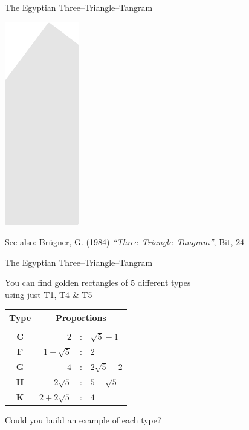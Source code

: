 \documentclass[14pt]{beamer}
\begin{document}
\begin{frame}{The Egyptian Three--Triangle--Tangram}
\begin{center}
            \includegraphics[scale=0.39]{figures/figure004k.pdf}\\

            \bigskip\medskip

            {\footnotesize See also: Brügner, G. (1984) \emph{``Three--Triangle--Tangram''}, Bit, 24}
        \end{center}
    \end{frame}


    \begin{frame}{The Egyptian Three--Triangle--Tangram}
        \begin{center}
            You can find golden rectangles of 5 different types\\[0.5ex]using just T1, T4 \& T5

            \bigskip\bigskip

            {\small\begin{tabular}{c|rcl}
                \textbf{Type} & \multicolumn{3}{c}{\textbf{Proportions}} \\[0.5ex]\hline&&&\\[-1.5ex]
                \textbf{C} & $2$               &\!\!\!\!:\!\!\!\!& $\sqrt{5}\!-\!1$  \\
                \textbf{F} & $1\!+\!\sqrt{5}$  &\!\!\!\!:\!\!\!\!& $2$               \\
                \textbf{G} & $4$               &\!\!\!\!:\!\!\!\!& $2\sqrt{5}\!-\!2$ \\
                \textbf{H} & $2\sqrt{5}$       &\!\!\!\!:\!\!\!\!& $5\!-\!\sqrt{5}$  \\
                \textbf{K} & $2\!+\!2\sqrt{5}$ &\!\!\!\!:\!\!\!\!& $4$               \\
            \end{tabular}}

            \bigskip\bigskip

            Could you build an example of each type?
        \end{center}
    \end{frame}
\end{document}
